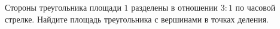 \begin{ex}
	\begin{condition}
		Стороны треугольника площади \( 1 \) разделены в отношении \( 3 : 1 \) по часовой стрелке. Найдите площадь треугольника с вершинами в точках деления.
	\end{condition}
\end{ex}